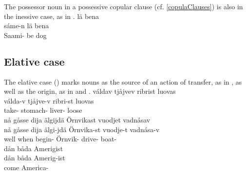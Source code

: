 The possessor noun in a possessive copular clause (cf. \SEC\ref{copulaClauses}) is also in the inessive case, as in .
\ea\label{iness3}
 lä bena\\
	sáme-n lä bena\\
	Saami- be\BS{} dog\BS{}\\\nopagebreak
{} %
\z


\subsection{Elative case}\label{elative}
The elative case (\ELATs) marks nouns as the source of an action of transfer, as in , as well as the origin, as in  and . 
\ea\label{elat1}
\glll	váldav tjåjvev {ribrist} luovas\\
	válda-v tjåjve-v ribri-st luovas\\
	take- stomach- liver- loose\\\nopagebreak
{} 
\z
\ea\label{elat2a}
\glll	nå gåsse dija älgijdä {Örnvikast} vuodjet vadnásav\\
	nå gåsse dija älgi-jdä Örnvika-st vuodje-t vadnása-v\\ %
	well when  begin- Örnvik- drive- boat-\\\nopagebreak
{} 
\z
\ea\label{elat2b}
\glll	dån båda {Amerigist}\\
	dån båda Amerig-ist\\
	 come\BS{} America-\\\nopagebreak
{} 
\z

